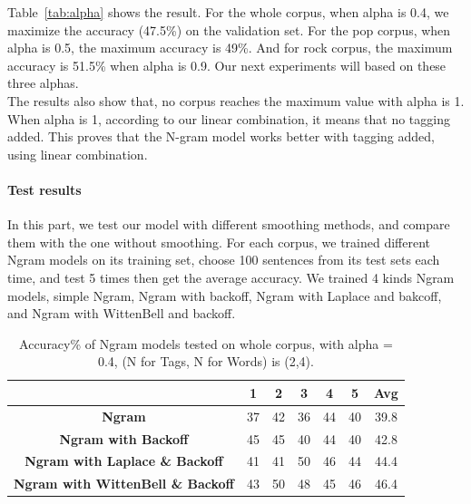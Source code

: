 \documentclass[a4paper,12pt]{article}
\begin{document}
Table~\ref{tab:alpha} shows the result. For the whole corpus, when alpha is 0.4, we maximize the accuracy (47.5\%) on the validation set. For the pop corpus, when alpha is 0.5, the maximum accuracy is 49\%. And for rock corpus, the maximum accuracy is 51.5\% when alpha is 0.9. Our next experiments will based on these three alphas.\\
The results also show that, no corpus reaches the maximum value with alpha is 1. When alpha is 1, according to our linear combination, it means that no tagging added. This proves that the N-gram model works better with tagging added, using linear combination.

\paragraph{Test results}
In this part, we test our model with different smoothing methods, and compare them with the one without smoothing. For each corpus, we trained different Ngram models on its training set, choose 100 sentences from its test sets each time, and test 5 times then get the average accuracy. We trained 4 kinds Ngram models, simple Ngram, Ngram with backoff, Ngram with Laplace and bakcoff, and Ngram with WittenBell and backoff.

\begin{table}[]
\centering
\begin{tabular}{|c|c|c|c|c|c|c|}
\hline
\rowcolor[HTML]{EFEFEF} 
 & \textbf{1} & \textbf{2} & \textbf{3} & \textbf{4} & \textbf{5} & \textbf{Avg} \\ \hline
\cellcolor[HTML]{EFEFEF}\textbf{Ngram} & 37 & 42 & 36 & 44 & 40 & 39.8 \\ \hline
\cellcolor[HTML]{EFEFEF}\textbf{Ngram with Backoff} & 45 & 45 & 40 & 44 & 40 & 42.8 \\ \hline
\cellcolor[HTML]{EFEFEF}\textbf{Ngram with Laplace \& Backoff} & 41 & 41 & 50 & 46 & 44 & 44.4 \\ \hline
\cellcolor[HTML]{EFEFEF}\textbf{Ngram with WittenBell \& Backoff} & 43 & 50 & 48 & 45 & 46 & 46.4 \\ \hline
\end{tabular}
\caption{Accuracy\% of Ngram models tested on whole corpus, with alpha = 0.4, (N for Tags, N for Words) is (2,4).}
\label{tab:whole}
\end{table}
\end{document}
